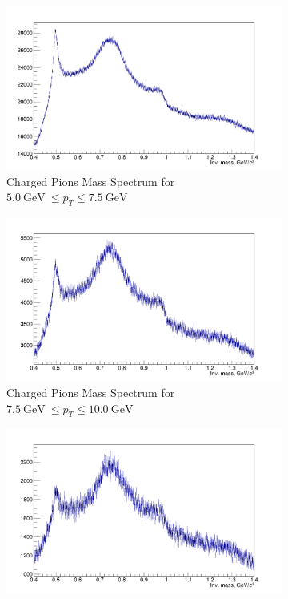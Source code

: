 \begin{figure}[h]
\begin{subfigure}[t]{.5\linewidth}
\end{subfigure}
\begin{subfigure}[t]{0.5\linewidth}
\centering
\includegraphics[width=0.98\linewidth]{Figures/ChargedPioSpectra/ChPioMassSpectrum50_75.png}
\caption{Charged Pions Mass Spectrum for $5.0 \ \mathrm{GeV} \ \leq p_T \leq 7.5 \ \mathrm{GeV}$}
\label{fig:MPtChPio50_75}
\end{subfigure} \hspace{0.1cm}
\begin{subfigure}[t]{.5\linewidth}
\centering
\includegraphics[width=0.98\linewidth]{Figures/ChargedPioSpectra/ChPioMassSpectrum75_100.png}
\caption{Charged Pions Mass Spectrum for $7.5 \ \mathrm{GeV} \ \leq p_T \leq 10.0 \ \mathrm{GeV}$}
\label{fig:MPtChPio75_100}
\end{subfigure}
\begin{subfigure}[t]{0.5\linewidth}
\centering
\includegraphics[width=0.98\linewidth]{Figures/ChargedPioSpectra/ChPioMassSpectrum100_150.png}

\end{subfigure}
\end{figure}
